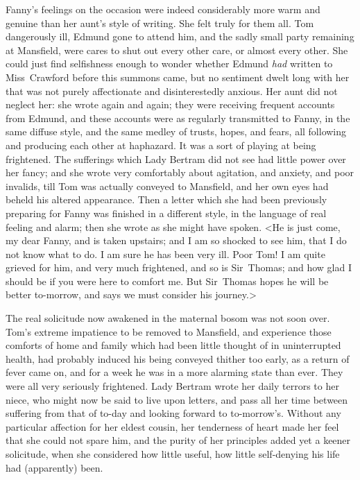 Fanny's feelings on the occasion were indeed considerably more warm and genuine than her aunt's style of writing. She felt truly for them all. Tom dangerously ill, Edmund gone to attend him, and the sadly small party remaining at Mansfield, were cares to shut out every other care, or almost every other. She could just find selfishness enough to wonder whether Edmund \textit{had}  written to Miss~Crawford before this summons came, but no sentiment dwelt long with her that was not purely affectionate and disinterestedly anxious. Her aunt did not neglect her: she wrote again and again; they were receiving frequent accounts from Edmund, and these accounts were as regularly transmitted to Fanny, in the same diffuse style, and the same medley of trusts, hopes, and fears, all following and producing each other at haphazard. It was a sort of playing at being frightened. The sufferings which Lady Bertram did not see had little power over her fancy; and she wrote very comfortably about agitation, and anxiety, and poor invalids, till Tom was actually conveyed to Mansfield, and her own eyes had beheld his altered appearance. Then a letter which she had been previously preparing for Fanny was finished in a different style, in the language of real feeling and alarm; then she wrote as she might have spoken. <He is just come, my dear Fanny, and is taken upstairs; and I am so shocked to see him, that I do not know what to do. I am sure he has been very ill. Poor Tom! I am quite grieved for him, and very much frightened, and so is Sir~Thomas; and how glad I should be if you were here to comfort me. But Sir~Thomas hopes he will be better to-morrow, and says we must consider his journey.>

The real solicitude now awakened in the maternal bosom was not soon over. Tom's extreme impatience to be removed to Mansfield, and experience those comforts of home and family which had been little thought of in uninterrupted health, had probably induced his being conveyed thither too early, as a return of fever came on, and for a week he was in a more alarming state than ever. They were all very seriously frightened. Lady Bertram wrote her daily terrors to her niece, who might now be said to live upon letters, and pass all her time between suffering from that of to-day and looking forward to to-morrow's. Without any particular affection for her eldest cousin, her tenderness of heart made her feel that she could not spare him, and the purity of her principles added yet a keener solicitude, when she considered how little useful, how little self-denying his life had (apparently) been.

